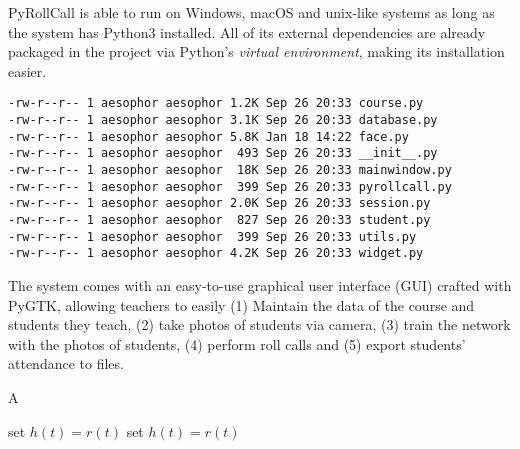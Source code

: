 PyRollCall is able to run on Windows, macOS and unix-like systems as long as
the system has Python3 installed. All of its external dependencies are already packaged
in the project via Python's \emph{virtual environment}, making its installation easier.

\vspace*{0.2cm}

\begin{lstlisting}[numbers=none,xleftmargin=0em]
-rw-r--r-- 1 aesophor aesophor 1.2K Sep 26 20:33 course.py
-rw-r--r-- 1 aesophor aesophor 3.1K Sep 26 20:33 database.py
-rw-r--r-- 1 aesophor aesophor 5.8K Jan 18 14:22 face.py
-rw-r--r-- 1 aesophor aesophor  493 Sep 26 20:33 __init__.py
-rw-r--r-- 1 aesophor aesophor  18K Sep 26 20:33 mainwindow.py
-rw-r--r-- 1 aesophor aesophor  399 Sep 26 20:33 pyrollcall.py
-rw-r--r-- 1 aesophor aesophor 2.0K Sep 26 20:33 session.py
-rw-r--r-- 1 aesophor aesophor  827 Sep 26 20:33 student.py
-rw-r--r-- 1 aesophor aesophor  399 Sep 26 20:33 utils.py
-rw-r--r-- 1 aesophor aesophor 4.2K Sep 26 20:33 widget.py
\end{lstlisting}

The system comes with an easy-to-use graphical user interface (GUI) crafted with PyGTK,
allowing teachers to easily
(1) Maintain the data of the course and students they teach,
(2) take photos of students via camera,
(3) train the network with the photos of students,
(4) perform roll calls and
(5) export students' attendance to files.

\begin{algorithm}  
\caption{A}  
\label{alg:A}  
\begin{algorithmic}  
\REPEAT   
\STATE set $h(t)=r(t)$   
\REPEAT  
\STATE set $h(t)=r(t)$   
\end{algorithmic}  
\end{algorithm}  
